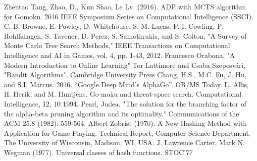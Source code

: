 \documentclass[a4paper, 11pt]{article} %
\begin{document}
	\begin{thebibliography}{99}
		 Zhentao Tang, Zhao, D., Kun Shao, Le Lv. (2016). ADP with MCTS algorithm for Gomoku. 2016 IEEE Symposium Series on Computational Intelligence (SSCI).
		 C. B. Browne, E. Powley, D. Whitehouse, S. M. Lucas, P. I. Cowling, P. Rohlfshagen, S. Tavener, D. Perez, S. Samothrakis, and S. Colton, "A Survey of Monte Carlo Tree Search Methods," IEEE Transactions on Computational Intelligence and AI in Games, vol. 4, pp. 1-43, 2012.
		 Francesco Orabona, "A Modern Introduction to Online Learning"
		 Tor Lattimore and Csaba Szepesvári, "Bandit Algorithms", Cambridge University Press
		 Chang, H.S., M.C. Fu, J. Hu, and S.I. Marcus. 2016. “Google Deep Mind’s AlphaGo”. OR/MS Today.
		L. Allis, H. Herik, and M. Huntjens. Go-moku and
		threat-space search. Computational Intelligence, 12, 10 1994.
		Pearl, Judea. "The solution for the branching factor of the alpha-beta pruning algorithm and its optimality." Communications of the ACM 25.8 (1982): 559-564.
		Albert Zobrist (1970). A New Hashing Method with Application for Game Playing. Technical Report, Computer Science Department, The University of Wisconsin, Madison, WI, USA.
		J. Lawrence Carter, Mark N. Wegman (1977). Universal classes of hash functions. STOC'77
		
	\end{thebibliography}
	
	
	
	
\end{document}
